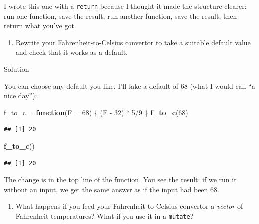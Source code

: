\documentclass[]{tufte-book}
\newenvironment{Shaded}{}{}
\newcommand{\ControlFlowTok}[1]{\textcolor[rgb]{0.00,0.44,0.13}{\textbf{#1}}}
\newcommand{\DataTypeTok}[1]{\textcolor[rgb]{0.56,0.13,0.00}{#1}}
\newcommand{\DecValTok}[1]{\textcolor[rgb]{0.25,0.63,0.44}{#1}}
\newcommand{\KeywordTok}[1]{\textcolor[rgb]{0.00,0.44,0.13}{\textbf{#1}}}
\newcommand{\NormalTok}[1]{#1}
\newcommand{\OperatorTok}[1]{\textcolor[rgb]{0.40,0.40,0.40}{#1}}
\newcommand{\StringTok}[1]{\textcolor[rgb]{0.25,0.44,0.63}{#1}}
\providecommand{\tightlist}{%
  \setlength{\itemsep}{0pt}\setlength{\parskip}{0pt}}
\theoremstyle{definition}
\theoremstyle{definition}
\theoremstyle{definition}
\theoremstyle{remark}
\begin{document}
I wrote this one with a \texttt{return} because I thought it made the
structure clearer: run one function, save the result, run another
function, save the result, then return what you've got.

\begin{enumerate}
\def\labelenumi{(\alph{enumi})}
\setcounter{enumi}{3}
\tightlist
\item
  Rewrite your Fahrenheit-to-Celsius convertor to take a suitable
  default value and check that it works as a default.
\end{enumerate}

Solution

You can choose any default you like. I'll take a default of 68 (what I
would call ``a nice day''):

\begin{Shaded}
\begin{Highlighting}[]
\NormalTok{f_to_c =}\StringTok{ }\ControlFlowTok{function}\NormalTok{(}\DataTypeTok{F =} \DecValTok{68}\NormalTok{) \{}
\NormalTok{    (F }\OperatorTok{-}\StringTok{ }\DecValTok{32}\NormalTok{) }\OperatorTok{*}\StringTok{ }\DecValTok{5}\OperatorTok{/}\DecValTok{9}
\NormalTok{\}}
\KeywordTok{f_to_c}\NormalTok{(}\DecValTok{68}\NormalTok{)}
\end{Highlighting}
\end{Shaded}

\begin{verbatim}
## [1] 20
\end{verbatim}

\begin{Shaded}
\begin{Highlighting}[]
\KeywordTok{f_to_c}\NormalTok{()}
\end{Highlighting}
\end{Shaded}

\begin{verbatim}
## [1] 20
\end{verbatim}

The change is in the top line of the function. You see the result: if we
run it without an input, we get the same answer as if the input had been
68.

\begin{enumerate}
\def\labelenumi{(\alph{enumi})}
\setcounter{enumi}{4}
\tightlist
\item
  What happens if you feed your Fahrenheit-to-Celsius convertor a
  \emph{vector} of Fahrenheit temperatures? What if you use it in a
  \texttt{mutate}?
\end{enumerate}
\end{document}
